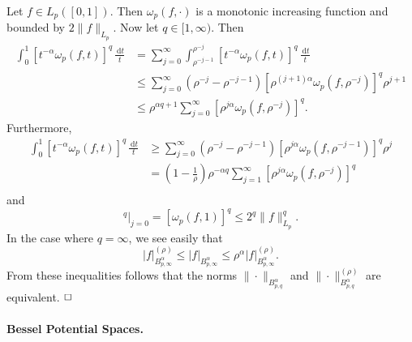\documentclass[12pt]{article}
\newenvironment{proof}{\begin{trivlist}
    \item[\hskip\labelsep{\it Proof.}]}{$\hfill\Box$\end{trivlist}}
\newcommand{\rd}{\,\mathrm{d}}
\begin{document}
\begin{proof}
Let $f\in L_p([0,1])$. Then $\omega_p(f,\cdot)$ is a monotonic
increasing function and bounded by $2\|f\|_{L_p}$. Now let
$q\in [1,\infty)$. Then
\begin{equation*}
\begin{split}
\int^1_0 [t^{-\alpha}\omega_p(f,t)]^q \,\frac{\rd t}{t}
&= \sum^\infty_{j=0} \int^{\rho^{-j}}_{\rho^{-j-1}}
[t^{-\alpha}\omega_p(f,t)]^q \,\frac{\rd t}{t}\\
&\le \sum^\infty_{j=0}
(\rho^{-j} - \rho^{-j-1})[\rho^{(j+1)\alpha}\omega_p(f,\rho^{-j})]^q
\rho^{j+1}\\
&\le \rho^{\alpha q+1} \sum^\infty_{j=0} [\rho^{j\alpha}
\omega_p(f, \rho^{-j})]^q.
\end{split}
\end{equation*}
Furthermore,
\begin{equation*}
\begin{split}
\int^1_0 [t^{-\alpha}\omega_p(f,t)]^q \,\frac{\rd t}{t}
&\ge \sum^\infty_{j=0}
(\rho^{-j} - \rho^{-j-1})[\rho^{j\alpha}\omega_p(f,\rho^{-j-1})]^q
\rho^{j}\\
&= \left( 1 - \frac{1}{\rho} \right) \rho^{-\alpha q}
\sum^\infty_{j=1} [\rho^{j\alpha}\omega_p(f,\rho^{-j})]^q \\
\end{split}
\end{equation*}
and
\begin{equation*}
[\rho^{j\alpha} \omega_p(f,\rho^{-j})]^q|_{j=0} = [\omega_p(f,1)]^q
\le 2^q\|f\|^q_{L_p}.
\end{equation*}
In the case where $q=\infty$, we see easily that
\begin{equation*}
|f|^{(\rho)}_{B^\alpha_{p,\infty}} \le
|f|_{B^\alpha_{p,\infty}} \le
\rho^{\alpha}|f|^{(\rho)}_{B^\alpha_{p,\infty}}.
\end{equation*}
From these inequalities follows that the norms
$\|\cdot\|_{B^\alpha_{p,q}}$ and
$\|\cdot\|^{(\rho)}_{B^\alpha_{p,q}}$ are equivalent.
\end{proof}

\paragraph{Bessel Potential Spaces.}
\end{document}
